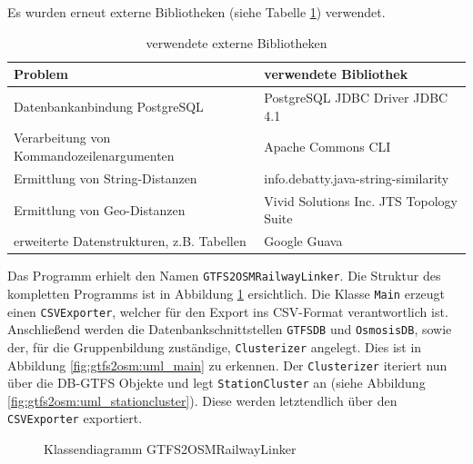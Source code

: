 Es wurden erneut externe Bibliotheken (siehe Tabelle \ref{tab:GTFS2OSM:Libraries}) verwendet.
\begin{table}[htb]
\small
\centering
\caption{verwendete externe Bibliotheken}
\label{tab:GTFS2OSM:Libraries}
\begin{tabular}{|l|l|}
\hline
\textbf{Problem}                          & \textbf{verwendete Bibliothek}     \\ \hline
Datenbankanbindung PostgreSQL             & PostgreSQL JDBC Driver JDBC 4.1    \\ \hline
Verarbeitung von Kommandozeilenargumenten & Apache Commons CLI                 \\ \hline
Ermittlung von String-Distanzen           & info.debatty.java-string-similarity         \\ \hline
Ermittlung von Geo-Distanzen           & Vivid Solutions Inc. JTS Topology Suite         \\ \hline
erweiterte Datenstrukturen, z.B. Tabellen & Google Guava          \\ \hline
\end{tabular}
\end{table}

Das Programm erhielt den Namen \texttt{GTFS2OSMRailwayLinker}.
Die Struktur des kompletten Programms ist in Abbildung \ref{fig:gtfs2osm:uml_full} ersichtlich.
Die Klasse \texttt{Main} erzeugt einen \texttt{CSVExporter}, welcher für den Export ins CSV-Format verantwortlich ist.
Anschließend werden die Datenbankschnittstellen \texttt{GTFSDB} und \texttt{OsmosisDB}, sowie der, für die Gruppenbildung zuständige, \texttt{Clusterizer} angelegt.
Dies ist in Abbildung \ref{fig:gtfs2osm:uml_main} zu erkennen.
Der \texttt{Clusterizer} iteriert nun über die DB-GTFS Objekte und legt \texttt{StationCluster} an (siehe Abbildung \ref{fig:gtfs2osm:uml_stationcluster}).
Diese werden letztendlich über den \texttt{CSVExporter} exportiert.

\begin{figure}[htb]
   \centering
   \caption{Klassendiagramm GTFS2OSMRailwayLinker}
   \label{fig:gtfs2osm:uml_full}
 \end{figure}


